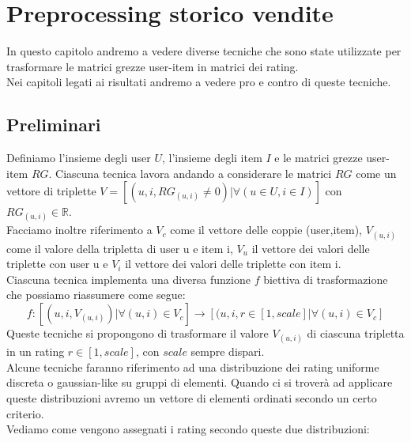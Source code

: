 
\hypertarget{(chap:capitolo4)}{}
\chapter{Preprocessing storico vendite}
In questo capitolo andremo a vedere diverse tecniche che sono state utilizzate per trasformare le matrici grezze user-item in matrici dei rating.\\
Nei capitoli legati ai risultati andremo a vedere pro e contro di queste tecniche.\\

\section{Preliminari}
Definiamo l'insieme degli user $U$, l'insieme degli item $I$ e le matrici grezze user-item $RG$.
Ciascuna tecnica lavora andando a considerare le matrici $RG$ come un vettore di triplette $V = [(u, i, RG_{(u,i)} \neq 0) |  \forall (u \in U,i \in I)]$ con $RG_{(u,i)} \in \mathbb{R}$.\\
Facciamo inoltre riferimento a $V_c$ come il vettore delle coppie (user,item), $V_{(u,i)}$ come il valore della tripletta di user u e item i, $V_u$ il vettore dei valori delle triplette con user u e $V_i$ il vettore dei valori delle triplette con item i.\\
Ciascuna tecnica implementa una diversa funzione $f$ biettiva di trasformazione che possiamo riassumere come segue:
$$f: [(u, i, V_{(u,i)}) |  \forall (u,i) \in V_c] \rightarrow [(u, i, r \in [1,scale] | \forall (u,i) \in V_c]$$
Queste tecniche si propongono di trasformare il valore $V_{(u,i)}$ di ciascuna tripletta in un rating $r \in [1,scale]$, con $scale$ sempre dispari.\\ 
Alcune tecniche faranno riferimento ad una distribuzione dei rating uniforme discreta o gaussian-like su gruppi di elementi. Quando ci si troverà ad applicare queste distribuzioni avremo un vettore di elementi ordinati secondo un certo criterio.\\
Vediamo come vengono assegnati i rating secondo queste due distribuzioni:
